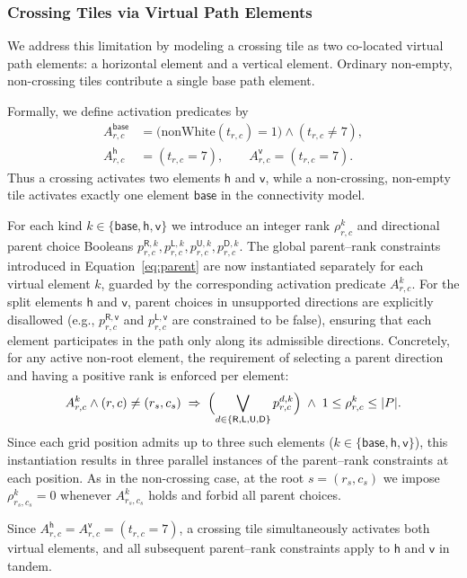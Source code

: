 \documentclass[acmsmall,screen,nonacm]{acmart}
\newcommand{\kind}[1]{\mathsf{#1}}
\begin{document}
\subsubsection{Crossing Tiles via Virtual Path Elements}

We address this limitation by modeling a crossing tile as two
co-located virtual path elements: a horizontal element and a vertical
element. Ordinary non-empty, non-crossing tiles contribute a single
base path element.

Formally, we define activation predicates by
\[
\begin{aligned}
A^{\kind{base}}_{r,c}
&= \bigl(\mathrm{nonWhite}(t_{r,c})=1\bigr)\wedge (t_{r,c}\neq 7),
\\
A^{\kind{h}}_{r,c}
&= (t_{r,c}=7),
\qquad
A^{\kind{v}}_{r,c}
= (t_{r,c}=7).
\end{aligned}
\]
Thus a crossing activates two elements \(\kind{h}\) and \(\kind{v}\),
while a non-crossing, non-empty tile activates exactly one element
\(\kind{base}\) in the connectivity model.

For each kind \(k\in\{\kind{base},\kind{h},\kind{v}\}\) we introduce
an integer rank \(\rho^{k}_{r,c}\) and directional parent choice
Booleans
\(p^{\kind{R},k}_{r,c},p^{\kind{L},k}_{r,c},p^{\kind{U},k}_{r,c},p^{\kind{D},k}_{r,c}\). The
global parent--rank constraints introduced in
Equation~\eqref{eq:parent} are now instantiated separately for each
virtual element \(k\), guarded by the corresponding activation
predicate \(A^{k}_{r,c}\). For the split elements \(\kind{h}\) and
\(\kind{v}\), parent choices in unsupported directions are explicitly
disallowed (e.g., \(p^{\kind{R},\kind{v}}_{r,c}\) and
\(p^{\kind{L},\kind{v}}_{r,c}\) are constrained to be false), ensuring that
each element participates in the path only along its admissible
directions. Concretely, for any active non-root element, the
requirement of selecting a parent direction and having a positive rank
is enforced per element:
\[
A^{k}_{r,c}\wedge (r,c)\neq (r_s,c_s)\;\Rightarrow\;
\Bigl(\bigvee_{d\in\{\kind{R},\kind{L},\kind{U},\kind{D}\}} p^{d,k}_{r,c}\Bigr)
\;\wedge\; 1\le \rho^{k}_{r,c}\le |P|.
\]
Since each grid position admits up to three such elements
(\(k\in\{\kind{base},\kind{h},\kind{v}\}\)), this instantiation
results in three parallel instances of the parent--rank constraints at
each position. As in the non-crossing case, at the root
\(s=(r_s,c_s)\) we impose \(\rho^{k}_{r_s,c_s}=0\) whenever
\(A^{k}_{r_s,c_s}\) holds and forbid all parent choices.

Since \(A^{\kind{h}}_{r,c}=A^{\kind{v}}_{r,c}=(t_{r,c}=7)\), a
crossing tile simultaneously activates both virtual elements, and all
subsequent parent--rank constraints apply to \(\kind{h}\) and
\(\kind{v}\) in tandem.
\end{document}
